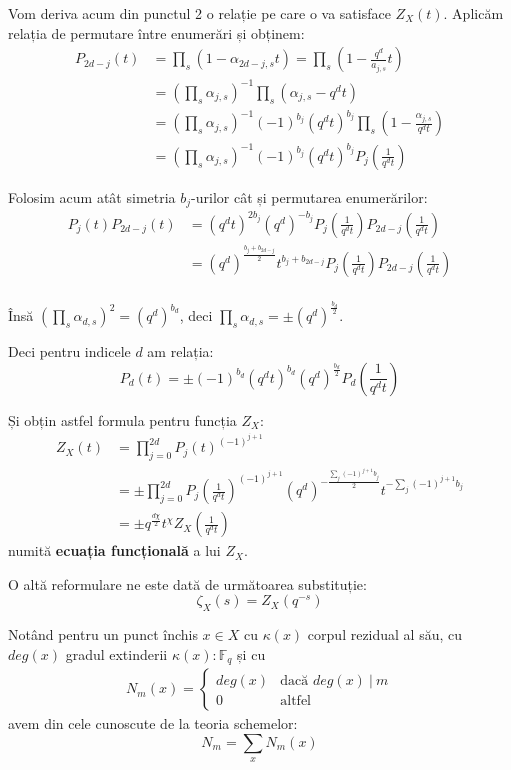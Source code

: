 \documentclass[13pt]{book}
\begin{document}
Vom deriva acum din punctul 2 o relație pe care o va satisface $Z_X(t)$. Aplicăm relația de permutare între enumerări și obținem:
\begin{align*}
P_{2d-j}(t)&=\prod_s(1-\alpha_{2d-j,s}t)=\prod_s(1-\frac{q^d}{a_{j,s}}t)\\
&=(\prod_s \alpha_{j,s})^{-1} \prod_s(\alpha_{j,s}-q^dt)\\
&=(\prod_s \alpha_{j,s})^{-1} (-1)^{b_j} (q^dt)^{b_j} \prod_s (1-\frac{\alpha_{j,s}}{q^dt})\\
&=(\prod_s \alpha_{j,s})^{-1} (-1)^{b_j} (q^dt)^{b_j}P_j(\frac{1}{q^dt})
\end{align*}

Folosim acum atât simetria $b_j$-urilor cât și permutarea enumerărilor:
\begin{align*}
P_j(t)P_{2d-j}(t)&=(q^dt)^{2b_j} (q^d)^{-b_j} P_j(\frac{1}{q^dt}) P_{2d-j}(\frac{1}{q^dt})\\
&=(q^d)^{\frac{b_j+b_{2d-j}}{2}} t^{b_j+b_{2d-j}}P_j(\frac{1}{q^dt}) P_{2d-j}(\frac{1}{q^dt})\\
\end{align*}

Însă $(\prod\limits_s \alpha_{d,s})^2=(q^d)^{b_d}$, deci $\prod\limits_s \alpha_{d,s}=\pm (q^d)^{\frac{b_d}{2}}$.

Deci pentru indicele $d$ am relația:
$$P_d(t)=\pm (-1)^{b_d} (q^dt)^{b_d} (q^d)^{\frac{b_d}{2}} P_d(\frac{1}{q^dt})$$

Și obțin astfel formula pentru funcția $Z_X$:
\begin{align*}
Z_X(t)&=\prod_{j=0}^{2d} P_j(t)^{(-1)^{j+1}}\\
&=\pm \prod_{j=0}^{2d} P_j(\frac{1}{q^dt})^{(-1)^{j+1}} (q^d)^{-\frac{\sum\limits_j (-1)^{j+1} b_j}{2}} t^{-\sum\limits_j (-1)^{j+1} b_j}\\
&=\pm q^{\frac{d\chi}{2}} t^{\chi} Z_X(\frac{1}{q^dt})
\end{align*}
numită {\bf ecuația funcțională} a lui $Z_X$.

O altă reformulare ne este dată de următoarea substituție:
$$\zeta_X(s)=Z_X(q^{-s})$$

Notând pentru un punct închis $x \in X$ cu $\kappa(x)$ corpul rezidual al său, cu $deg(x)$ gradul extinderii $\kappa(x) : \mathbb{F}_q$ și cu
\begin{align*}
N_m(x) = \left\{
     \begin{array}{lr}
       deg(x) & \text{dacă } deg(x)\ |\ m\\
       0 & \text{altfel}
     \end{array}
   \right.
\end{align*}
avem din cele cunoscute de la teoria schemelor:
$$N_m=\sum\limits_x N_m(x)$$
\end{document}
